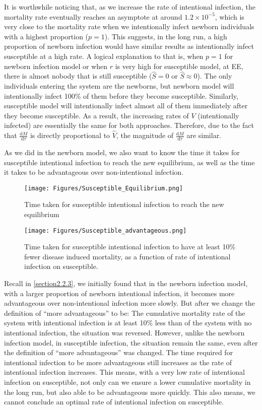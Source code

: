 \documentclass[12pt]{article}
\newcommand\dbyd[2]{\frac{\mathrm d{#1}}{\mathrm d{#2}}}
\begin{document}
It is worthwhile noticing that, as we increase the rate of intentional infection, the mortality rate eventually reaches an asymptote at around $1.2\times10^{-5}$, which is very close to the mortality rate when we intentionally infect newborn individuals with a highest proportion ($p=1$). This suggests, in the long run, a high proportion of newborn infection would have similar results as intentionally infect susceptible at a high rate. A logical explanation to that is, when $p=1$ for newborn infection model or when $r$ is very high for susceptible model, at EE, there is almost nobody that is still susceptible ($\hat{S}=0$ or $\hat{S}\approx0$). The only individuals entering the system are the newborns, but newborn model will intentionally infect 100\% of them before they become susceptible. Similarly, susceptible model will intentionally infect almost all of them immediately after they become susceptible. As a result, the increasing rates of $V$ (intentionally infected) are essentially the same for both approaches. Therefore, due to the fact that $\dbyd{M}{\tau}$ is directly proportional to $\hat{V}$, the magnitude of $\dbyd{M}{\tau}$ are similar.


As we did in the newborn model, we also want to know the time it takes for susceptible intentional infection to reach the new equilibrium, as well as the time it takes to be advantageous over non-intentional infection.

\begin{figure}[H]
  \centering
  \texttt{[image: Figures/Susceptible\_Equilibrium.png]}
  \caption{Time taken for susceptible intentional infection to reach the new equilibrium}
\end{figure}

\begin{figure}[H]
  \centering
  \texttt{[image: Figures/Susceptible\_advantageous.png]}
  \caption{Time taken for susceptible intentional infection to have at least 10$\%$ fewer disease induced mortality, as a function of rate of intentional infection on susceptible.}
\end{figure}

Recall in \autoref{section2.2.3}, we initially found that in the newborn infection model, with a larger proportion of newborn intentional infection, it becomes more advantageous over non-intentional infection more slowly. But after we change the definition of ``more advantageous'' to be: The cumulative mortality rate of the system with intentional infection is at least 10\% less than of the system with no intentional infection, the situation was reversed. However, unlike the newborn infection model, in susceptible infection, the situation remain the same, even after the definition of ``more advantageous'' was changed. The time required for intentional infection to be more advantageous still increases as the rate of intentional infection increases. This means, with a very low rate of intentional infection on susceptible, not only can we ensure a lower cumulative mortality in the long run, but also able to be advantageous more quickly. This also means, we cannot conclude an optimal rate of intentional infection on susceptible.
\end{document}
